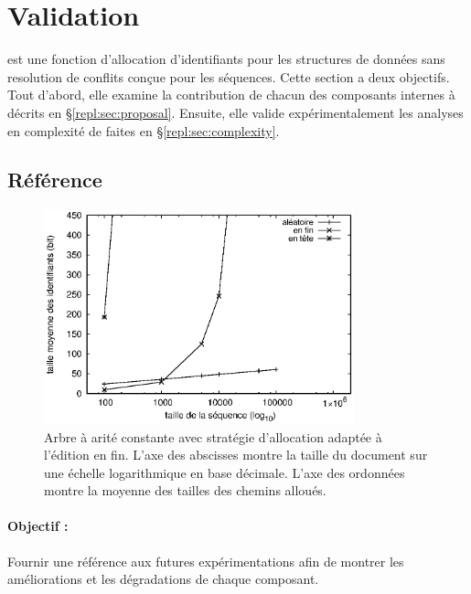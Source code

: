 
\section{Validation}
\label{repl:sec:validation}

\LSEQ est une fonction d'allocation d'identifiants pour les structures de
données sans resolution de conflits conçue pour les séquences.  Cette section a
deux objectifs. Tout d'abord, elle examine la contribution de chacun des
composants internes à \LSEQ décrits en §\ref{repl:sec:proposal}.  Ensuite, elle
valide expérimentalement les analyses en complexité de \LSEQ faites en
§\ref{repl:sec:complexity}.

\subsection{Référence}

\begin{figure}
  \begin{center}
    \includegraphics[width=0.8\textwidth]{img/lseq/logoot.eps}
    \caption{\label{repl:img:logoot} Arbre à arité constante avec stratégie
      d'allocation adaptée à l'édition en fin. L'axe des abscisses montre la
      taille du document sur une échelle logarithmique en base décimale. L'axe
      des ordonnées montre la moyenne des tailles des chemins alloués.}
  \end{center}
\end{figure}


\paragraph{Objectif :} Fournir une référence aux futures expérimentations afin
de montrer les améliorations et les dégradations de chaque composant.

